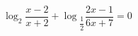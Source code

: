 \begin{ex}[type=equation]
	\begin{condition}
		$\log_2 \dfrac{x - 2}{x + 2} + \log$\tiny$_{\dfrac{1}{2}}$\normalsize$\dfrac{2x - 1}{6x + 7} = 0$
	\end{condition}
\end{ex}